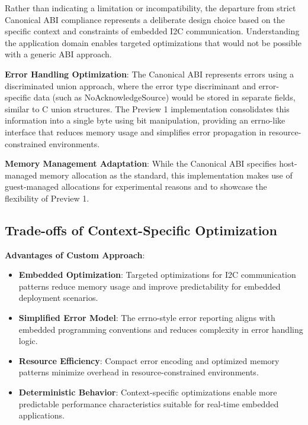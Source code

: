 Rather than indicating a limitation or incompatibility, the departure from strict Canonical ABI compliance represents a deliberate design choice based on the specific context and constraints of embedded I2C communication. Understanding the application domain enables targeted optimizations that would not be possible with a generic ABI approach.

\textbf{Error Handling Optimization}: The Canonical ABI represents errors using a discriminated union approach, where the error type discriminant and error-specific data (such as NoAcknowledgeSource) would be stored in separate fields, similar to C union structures. The Preview 1 implementation consolidates this information into a single byte using bit manipulation, providing an errno-like interface that reduces memory usage and simplifies error propagation in resource-constrained environments.

\textbf{Memory Management Adaptation}: While the Canonical ABI specifies host-managed memory allocation as the standard, this implementation makes use of guest-managed allocations for experimental reasons and to showcase the flexibility of Preview 1.

\subsection{Trade-offs of Context-Specific Optimization}

\textbf{Advantages of Custom Approach}:
\begin{itemize}
    \item \textbf{Embedded Optimization}: Targeted optimizations for I2C communication patterns reduce memory usage and improve predictability for embedded deployment scenarios.
    \item \textbf{Simplified Error Model}: The errno-style error reporting aligns with embedded programming conventions and reduces complexity in error handling logic.
    \item \textbf{Resource Efficiency}: Compact error encoding and optimized memory patterns minimize overhead in resource-constrained environments.
    \item \textbf{Deterministic Behavior}: Context-specific optimizations enable more predictable performance characteristics suitable for real-time embedded applications.
\end{itemize}

